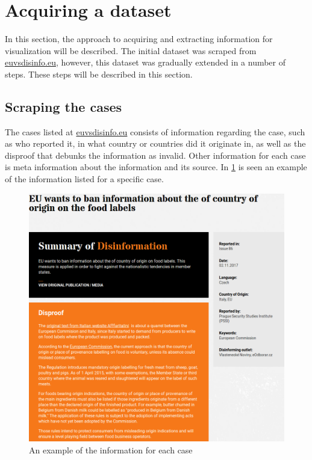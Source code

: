\documentclass{article}
\begin{document}
\section{Acquiring a dataset}
In this section, the approach to acquiring and extracting information for visualization will be described. The initial dataset was scraped from \href{https://www.euvsdisinfo.eu}{euvsdisinfo.eu}, however, this dataset was gradually extended in a number of steps. These steps will be described in this section.

\subsection{Scraping the cases}
The cases listed at \href{https://www.euvsdisinfo.eu}{euvsdisinfo.eu} consists of information regarding the case, such as who reported it, in what country or countries did it originate in, as well as the disproof that debunks the information as invalid. Other information for each case is meta information about the information and its source. In \cref{fig:single_case} is seen an example of the information listed for a specific case.
\begin{figure}[H]
    \centering
    \caption{An example of the information for each case}
    \label{fig:single_case}
    \includegraphics[width=.9\textwidth]{images/example_fakenews.png}
\end{figure}
\end{document}
